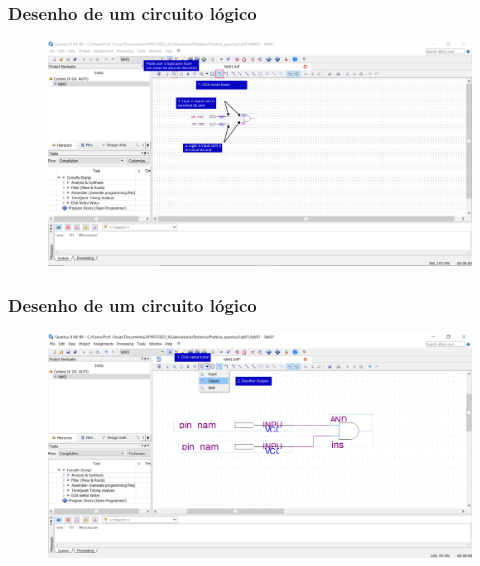 \documentclass{CPSPresentation}
\begin{document}
\begin{frame}
	\frametitle{Desenho de um circuito lógico}
	
	
	\begin{figure}[h]
		\centering
		\includegraphics[width=1.02\textwidth]{quartus/fig12.pdf}
	\end{figure}
	
	
\end{frame}
\begin{frame}
	\frametitle{Desenho de um circuito lógico}
	
	
	\begin{figure}[h]
		\centering
		\includegraphics[width=1.02\textwidth]{quartus/fig13.pdf}
	\end{figure}
	
	
\end{frame}
\end{document}
